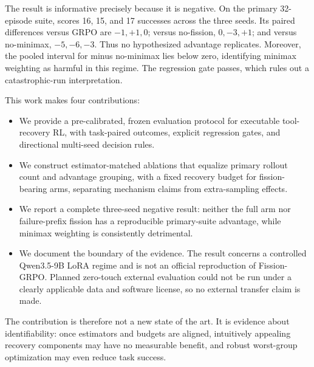 The result is informative precisely because it is negative.  On the primary
32-episode suite, \method{} scores 16, 15, and 17 successes across the three
seeds.  Its paired differences versus GRPO are $-1,+1,0$; versus no-fission,
$0,-3,+1$; and versus no-minimax, $-5,-6,-3$.  Thus no hypothesized advantage
replicates.  Moreover, the pooled interval for \method{} minus no-minimax lies
below zero, identifying minimax weighting as harmful in this regime.  The
regression gate passes, which rules out a catastrophic-run interpretation.

This work makes four contributions:

\begin{itemize}[leftmargin=*]
    \item We provide a pre-calibrated, frozen evaluation protocol for
    executable tool-recovery RL, with task-paired outcomes, explicit
    regression gates, and directional multi-seed decision rules.
    \item We construct estimator-matched ablations that equalize primary
    rollout count and advantage grouping, with a fixed recovery budget for
    fission-bearing arms, separating mechanism claims from extra-sampling
    effects.
    \item We report a complete three-seed negative result: neither the full
    \method{} arm nor failure-prefix fission has a reproducible primary-suite
    advantage, while minimax weighting is consistently detrimental.
    \item We document the boundary of the evidence.  The result concerns a
    controlled Qwen3.5-9B LoRA regime and is not an official reproduction of
    Fission-GRPO.  Planned zero-touch external evaluation could not be run
    under a clearly applicable data and software license, so no external
    transfer claim is made.
\end{itemize}

The contribution is therefore not a new state of the art.  It is evidence
about identifiability: once estimators and budgets are aligned, intuitively
appealing recovery components may have no measurable benefit, and robust
worst-group optimization may even reduce task success.
